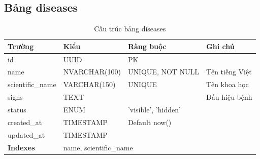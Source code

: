 \documentclass[12pt,a4paper]{article}
\begin{document}
\subsection{Bảng diseases}
\begin{longtable}{|l|l|l|p{5.5cm}|}
    \caption{Cấu trúc bảng diseases}                                          \\
    \hline
    \rowcolor{headerblue}
    \textbf{Trường}  & \textbf{Kiểu} & \textbf{Ràng buộc}  & \textbf{Ghi chú} \\
    \hline
    id               & UUID          & PK                  &                  \\
    \hline
    name             & NVARCHAR(100) & UNIQUE, NOT NULL    & Tên tiếng Việt   \\
    \hline
    scientific\_name & VARCHAR(150)  & UNIQUE              & Tên khoa học     \\
    \hline
    signs            & TEXT          &                     & Dấu hiệu bệnh    \\
    \hline
    status           & ENUM          & 'visible', 'hidden' &                  \\
    \hline
    created\_at      & TIMESTAMP     & Default now()       &                  \\
    \hline
    updated\_at      & TIMESTAMP     &                     &                  \\
    \hline
    \rowcolor{headerblue}
    \textbf{Indexes} & \multicolumn{3}{l|}{name, scientific\_name}               \\
    \hline
\end{longtable}
\end{document}

